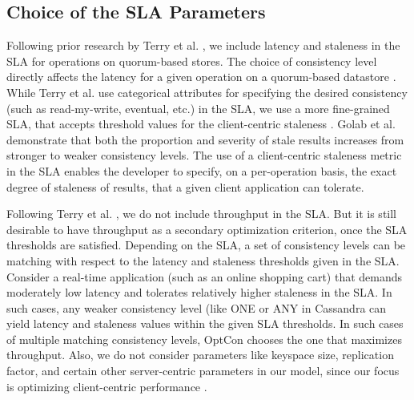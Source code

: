 \documentclass[conference]{IEEEtran}
\begin{document}
     \subsection{Choice of the SLA Parameters} \label{sec:parameters}
Following prior research  by Terry et al. \cite{Terry:2013:CSL:2517349.2522731}, we include latency and staleness in the SLA for operations on quorum-based stores. The choice of consistency level directly affects the
 latency for a  given operation on a quorum-based datastore \cite{Lakshman:2010:CDS:1773912.1773922}.
  While Terry et al. \cite{Terry:2013:CSL:2517349.2522731} use categorical attributes for specifying the desired consistency (such as read-my-write, eventual, etc.) in the SLA, we use a more
  fine-grained SLA, that accepts threshold values for the client-centric staleness \cite{DBLP:conf/cloud/GolabRAKWG13}. Golab et al. \cite{DBLP:conf/cloud/GolabRAKWG13} demonstrate that both the proportion and severity of stale results increases from stronger to weaker consistency levels.
 The use of a client-centric staleness metric in the SLA enables the developer to specify, on a per-operation basis, the exact degree of staleness of results, that a given client application can tolerate.
\par Following Terry et al. \cite{Terry:2013:CSL:2517349.2522731},  we do not include throughput in
       the SLA. But it is still desirable to have throughput \cite{PlanetCassandra} as a secondary optimization
        criterion, once the SLA thresholds are satisfied.
        Depending on the SLA, a set
         of consistency levels can be matching with respect to the latency and staleness thresholds given in the SLA. Consider a real-time application (such as an online shopping cart) that demands moderately low latency and tolerates relatively higher  staleness in the SLA.  In such cases, any weaker consistency level (like ONE or ANY in Cassandra can yield latency and staleness values within the given SLA thresholds. In such cases of
        multiple matching consistency levels, OptCon chooses the one that maximizes throughput. Also, we do not consider parameters like keyspace size, replication factor, and certain other server-centric parameters in our model, since our focus is optimizing client-centric performance \cite{DBLP:conf/cloud/GolabRAKWG13}. 
\end{document}

